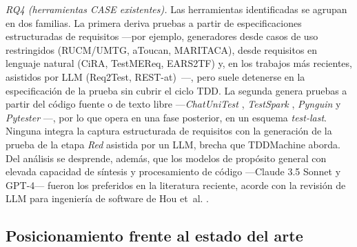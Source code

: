 \documentclass[10pt,journal,twoside,letterpaper]{IEEEtran}
\begin{document}
    \textit{RQ4 (herramientas CASE existentes).} Las herramientas identificadas se agrupan en dos familias. La primera deriva pruebas a partir de especificaciones estructuradas de requisitos ---por ejemplo, generadores desde casos de uso restringidos (RUCM/UMTG, aToucan, MARITACA), desde requisitos en lenguaje natural (CiRA, TestMEReq, EARS2TF) y, en los trabajos más recientes, asistidos por LLM (Req2Test, REST-at)~\cite{Morales2024Dsl,Khaldi2026Agentic,Orekhov2026Example,Fathima2026Automated,Bhatia2025Automated,Jang2025Automatic,Shimizu2025Automatic,Ishinari2026Data,Arruda2026Deriving,Trinh2026Fstg,Ishinari2025Improving,Louzaoui2016Invalid,Borg2022Quality,LeonQuinstedt2026Rest,Franca2026Req2test,Sinha2015Requirements,Wei2024Requirements,Wen2026Research,Salari2026Test,Varpe2025User,Li2026Test,Trinh2026Tcg,Wu2022Node,Herwanto2025Enhancing,Baker2026Industrial,Dilorenzo2026Recommending}---, pero suele detenerse en la especificación de la prueba sin cubrir el ciclo TDD. La segunda genera pruebas a partir del código fuente o de texto libre ---\emph{ChatUniTest} \cite{chen2024chatunitest}, \emph{TestSpark} \cite{sapozhnikov2024testspark}, \emph{Pynguin} \cite{lukasczyk2022pynguin} y \emph{Pytester} \cite{takerngsaksiri2025pytester}---, por lo que opera en una fase posterior, en un esquema \emph{test-last}. Ninguna integra la captura estructurada de requisitos con la generación de la prueba de la etapa \emph{Red} asistida por un LLM, brecha que TDDMachine aborda. Del análisis se desprende, además, que los modelos de propósito general con elevada capacidad de síntesis y procesamiento de código ---Claude 3.5 Sonnet y GPT-4--- fueron los preferidos en la literatura reciente, acorde con la revisión de LLM para ingeniería de software de Hou et~al. \cite{hou2024llm4se}.
    
    \subsection{Posicionamiento frente al estado del arte}
    \label{subsec:posicionamiento}
    
\end{document}
